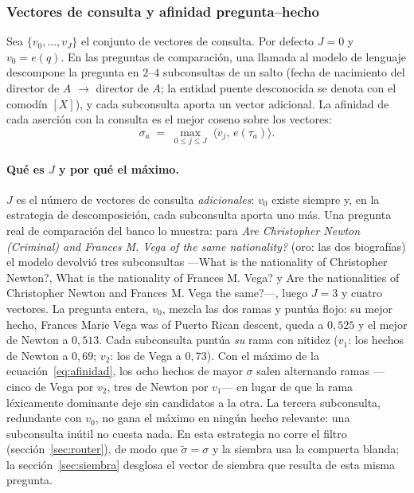\documentclass[11pt,a4paper]{article}
\begin{document}
\subsubsection{Vectores de consulta y afinidad pregunta--hecho}
\label{sec:afinidad}

Sea $\{v_0,\dots,v_J\}$ el conjunto de vectores de consulta. Por defecto
$J=0$ y $v_0 = e(q)$. En las preguntas de comparación, una llamada al modelo
de lenguaje descompone la pregunta en $2$--$4$ subconsultas de un salto
(\guillemotleft{}fecha de nacimiento del director de $A$\guillemotright{} $\to$ \guillemotleft{}director de $A$\guillemotright{};
la entidad puente desconocida se denota con el comodín $[X]$), y cada
subconsulta aporta un vector adicional. La afinidad de cada aserción con la
consulta es el mejor coseno sobre los vectores:
\begin{equation}
\sigma_a \;=\; \max_{0\le j\le J}\;\bigl\langle v_j,\, e(\tau_a)\bigr\rangle .
\label{eq:afinidad}
\end{equation}

\paragraph{Qué es $J$ y por qué el máximo.}
$J$ es el número de vectores de consulta \emph{adicionales}: $v_0$ existe
siempre y, en la estrategia de descomposición, cada subconsulta aporta
uno más. Una pregunta real de comparación del banco lo muestra: para
\guillemotleft{}\emph{Are Christopher Newton (Criminal) and Frances M. Vega of the
same nationality?}\guillemotright{} (oro: las dos biografías) el modelo devolvió tres
subconsultas ---\guillemotleft{}What is the nationality of Christopher Newton?\guillemotright{},
\guillemotleft{}What is the nationality of Frances M. Vega?\guillemotright{} y \guillemotleft{}Are the
nationalities of Christopher Newton and Frances M. Vega the same?\guillemotright{}---,
luego $J=3$ y cuatro vectores. La pregunta entera, $v_0$, mezcla las dos
ramas y puntúa flojo: su mejor hecho, \guillemotleft{}Frances Marie Vega was of
Puerto Rican descent\guillemotright{}, queda a $0{,}525$ y el mejor de Newton a
$0{,}513$. Cada subconsulta puntúa \emph{su} rama con nitidez ($v_1$: los
hechos de Newton a $0{,}69$; $v_2$: los de Vega a $0{,}73$). Con el
máximo de la ecuación~\eqref{eq:afinidad}, los ocho hechos de mayor
$\sigma$ salen alternando ramas ---cinco de Vega por $v_2$, tres de
Newton por $v_1$--- en lugar de que la rama léxicamente dominante deje
sin candidatos a la otra. La tercera subconsulta, redundante con $v_0$,
no gana el máximo en ningún hecho relevante: una subconsulta inútil no
cuesta nada. En esta estrategia no corre el filtro
(sección~\ref{sec:router}), de modo que $\tilde\sigma=\sigma$ y la
siembra usa la compuerta blanda; la sección~\ref{sec:siembra} desglosa
el vector de siembra que resulta de esta misma pregunta.
\end{document}
